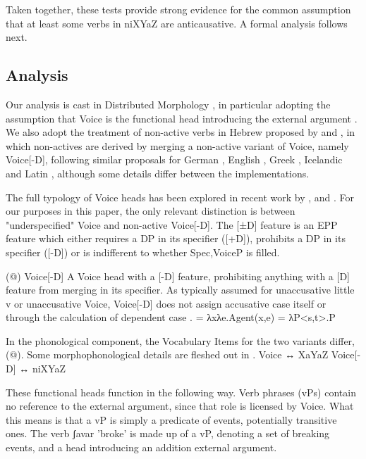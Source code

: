 Taken together, these tests provide strong evidence for the common assumption that at least some verbs in niXYaZ are anticausative. A formal analysis follows next.

	
	\subsection{Analysis}
Our analysis is cast in Distributed Morphology \citep{dm}, in particular adopting the assumption that Voice is the functional head introducing the external argument \citep{kratzer96,pylkkanen08}. We also adopt the treatment of non-active verbs in Hebrew proposed by \cite{alexiadoudoron12} and \cite{kastner17gjgl}, in which non-actives are derived by merging a non-active variant of Voice, namely Voice[-D], following similar proposals for German \citep{schaefer08,layering15}, English \cite{bruening14nllt}, Greek \citep{alexiadoudoron12,spathasetal15}, Icelandic \citep{wood15springer} and Latin \citep{kastnerzu15li}, although some details differ between the implementations.

The full typology of Voice heads has been explored in recent work by \cite{kastner16phd,kastner17gjgl,kastner16nllt,kastner18}, \cite{oseki17nyu} and \cite{nie17}. For our purposes in this paper, the only relevant distinction is between "underspecified" Voice and non-active Voice[-D]. The [±D] feature is an EPP feature which either requires a DP in its specifier ([+D]), prohibits a DP in its specifier ([-D]) or is indifferent to whether Spec,VoiceP is filled.

(@)    Voice[-D] \citep{kastner17gjgl}
    A Voice head with a [-D] feature, prohibiting anything with a [D] feature from merging in its specifier. 
    As typically assumed for unaccusative little v or unaccusative Voice, {Voice[-D]} does not assign accusative case itself \citep{chomsky95} or through the calculation of dependent case \citep{marantz91}.
 = λxλe.Agent(x,e)
 = λP<s,t>.P

In the phonological component, the Vocabulary Items for the two variants differ, (@). Some morphophonological details are fleshed out in \citep{kastner16nllt}.
    Voice ↔ XaYaZ
    Voice[-D] ↔ niXYaZ

These functional heads function in the following way. Verb phrases (vPs) contain no reference to the external argument, since that role is licensed by Voice. What this means is that a vP is simply a predicate of events, potentially transitive ones. The verb ʃavar 'broke' is made up of a vP, denoting a set of breaking events, and a head introducing an addition external argument.

